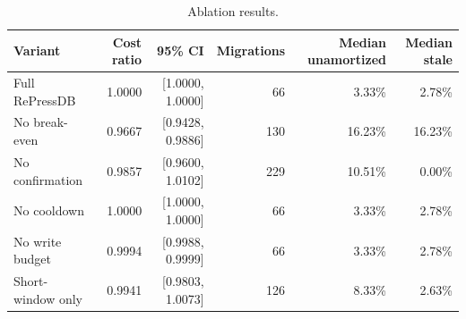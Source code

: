 \begin{table}[!tbp]
\centering
\caption{Ablation results.}
\label{tab:unified_ablation}
\begin{tabular}{@{}lrrrrr@{}}
\toprule
Variant & Cost ratio & 95\% CI & Migrations & Median unamortized & Median stale \\
\midrule
Full RePressDB & 1.0000 & [1.0000, 1.0000] & 66 & 3.33\% & 2.78\% \\
No break-even & 0.9667 & [0.9428, 0.9886] & 130 & 16.23\% & 16.23\% \\
No confirmation & 0.9857 & [0.9600, 1.0102] & 229 & 10.51\% & 0.00\% \\
No cooldown & 1.0000 & [1.0000, 1.0000] & 66 & 3.33\% & 2.78\% \\
No write budget & 0.9994 & [0.9988, 0.9999] & 66 & 3.33\% & 2.78\% \\
Short-window only & 0.9941 & [0.9803, 1.0073] & 126 & 8.33\% & 2.63\% \\
\bottomrule
\end{tabular}
\end{table}
